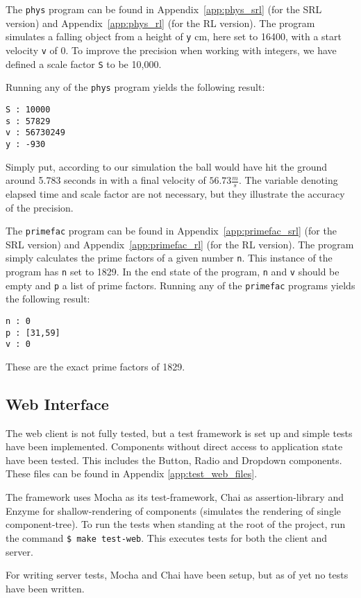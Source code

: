 The \texttt{phys} program can be found in Appendix~\ref{app:phys_srl} (for the SRL version) and Appendix~\ref{app:phys_rl} (for the RL version).
The program simulates a falling object from a height of \texttt{y} cm, here set to 16400, with a start velocity \texttt{v} of 0. To improve the precision when working with integers, we have defined a scale factor \texttt{S} to be 10,000.

Running any of the \texttt{phys} program yields the following result:
\begin{verbatim}
S : 10000
s : 57829
v : 56730249
y : -930
\end{verbatim}
Simply put, according to our simulation the ball would have hit the ground around 5.783 seconds in with a final velocity of $56.73 \frac{m}{s}$. The variable denoting elapsed time and scale factor are not necessary, but they illustrate the accuracy of the precision.


The \texttt{primefac} program can be found in Appendix~\ref{app:primefac_srl} (for the SRL version) and Appendix~\ref{app:primefac_rl} (for the RL version). The program simply calculates the prime factors of a given number \texttt{n}. This instance of the program has \texttt{n} set to 1829. In the end state of the program, \texttt{n} and \texttt{v} should be empty and \texttt{p} a list of prime factors. Running any of the \texttt{primefac} programs yields the following result:
\begin{verbatim}
n : 0
p : [31,59]
v : 0
\end{verbatim}
These are the exact prime factors of 1829.

\subsection{Web Interface}

The web client is not fully tested, but a test framework is set up and simple tests have been implemented. Components without direct access to application state have been tested. This includes the Button, Radio and Dropdown components.
These files can be found in Appendix \ref{app:test_web_files}.

The framework uses Mocha as its test-framework, Chai as assertion-library and Enzyme for shallow-rendering of components (simulates the rendering of single component-tree).
To run the tests when standing at the root of the project, run the command \texttt{\$ make test-web}.
This executes tests for both the client and server.

For writing server tests, Mocha and Chai have been setup, but as of yet no tests have been written.

